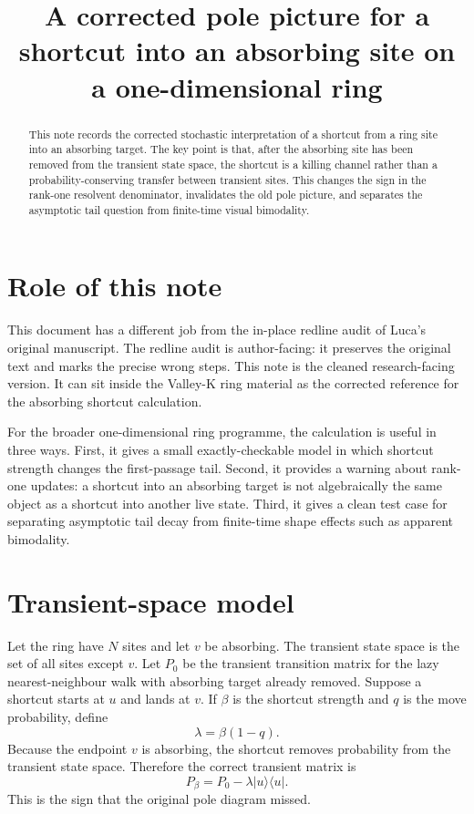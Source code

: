\documentclass[11pt]{article}
\title{A corrected pole picture for a shortcut into an absorbing site on a one-dimensional ring}
\author{}
\date{}
\newcommand{\ket}[1]{|#1\rangle}
\newcommand{\bra}[1]{\langle #1|}
\begin{document}
\maketitle

\begin{abstract}
This note records the corrected stochastic interpretation of a shortcut from a
ring site into an absorbing target.  The key point is that, after the absorbing
site has been removed from the transient state space, the shortcut is a killing
channel rather than a probability-conserving transfer between transient sites.
This changes the sign in the rank-one resolvent denominator, invalidates the
old pole picture, and separates the asymptotic tail question from finite-time
visual bimodality.
\end{abstract}

\section{Role of this note}

This document has a different job from the in-place redline audit of Luca's
original manuscript.  The redline audit is author-facing: it preserves the
original text and marks the precise wrong steps.  This note is the cleaned
research-facing version.  It can sit inside the Valley-K ring material as the
corrected reference for the absorbing shortcut calculation.

For the broader one-dimensional ring programme, the calculation is useful in
three ways.  First, it gives a small exactly-checkable model in which shortcut
strength changes the first-passage tail.  Second, it provides a warning about
rank-one updates: a shortcut into an absorbing target is not algebraically the
same object as a shortcut into another live state.  Third, it gives a clean test
case for separating asymptotic tail decay from finite-time shape effects such as
apparent bimodality.

\section{Transient-space model}

Let the ring have \(N\) sites and let \(v\) be absorbing.  The transient state
space is the set of all sites except \(v\).  Let \(P_0\) be the transient
transition matrix for the lazy nearest-neighbour walk with absorbing target
already removed.  Suppose a shortcut starts at \(u\) and lands at \(v\).  If
\(\beta\) is the shortcut strength and \(q\) is the move probability, define
\[
  \lambda=\beta(1-q).
\]
Because the endpoint \(v\) is absorbing, the shortcut removes probability from
the transient state space.  Therefore the correct transient matrix is
\begin{equation}
  P_\beta=P_0-\lambda\ket{u}\bra{u}.
  \label{eq:killed-transient}
\end{equation}
This is the sign that the original pole diagram missed.
\end{document}
